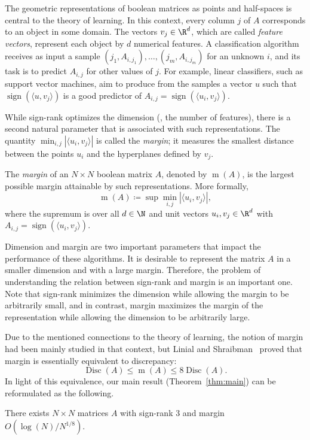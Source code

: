 \documentclass{toc}
\DeclareMathOperator{\Disc}{Disc}
\DeclareMathOperator{\sign}{sign}
\DeclareMathOperator{\margin}{m}
\newcommand{\defeq}{\coloneqq}
\begin{document}
The geometric representations of boolean matrices as points and half-spaces is central to the  theory of learning. In this context, every column $j$ of $A$ corresponds to an object in some domain. The vectors $v_j \in \R^d$, which are called \emph{feature vectors}, represent each object by  $d$ numerical features.  A classification algorithm receives as input a sample $(j_1,A_{i,j_1}),\ldots,(j_m,A_{i,j_m})$ for an unknown $i$, and its task is to predict $A_{i,j}$ for other values of $j$. For example, linear classifiers, such as support vector machines, aim to produce from the samples a vector $u$ such that $\sign(\langle u,v_j\rangle)$ is a good predictor of $A_{i,j}=\sign(\langle u_i,v_j\rangle)$. 


While sign-rank optimizes the dimension (\ie, the number of features), there is a second natural parameter that is associated with such representations. The quantity $\min_{i,j} |\langle u_i,v_j \rangle|$ is called the \emph{margin}; it measures the smallest distance between the points $u_i$ and the hyperplanes defined by $v_j$.   

The \emph{margin} of an $N \times N$ boolean matrix  $A$, denoted by $\margin(A)$, is the largest possible margin attainable by such representations. More formally,  
$$\margin(A) \defeq \sup \min_{i,j}\left|\langle u_i,v_j \rangle \right|,$$
where the supremum is over all $d \in \N$ and  unit vectors $u_i, v_j \in \R^d$ with $A_{i,j}=\sign(\langle u_i,v_j \rangle)$. 
 
Dimension and margin are two important parameters that impact   the performance of these algorithms. It is desirable to represent the matrix $A$ in a smaller dimension and with a large margin. Therefore, the problem of understanding the relation between sign-rank and margin is an important one. Note that sign-rank minimizes the dimension while allowing the margin to be arbitrarily small, and in contrast, margin maximizes the margin of the representation while allowing the dimension to be arbitrarily large.


Due to the mentioned connections to the theory of learning, the notion of margin had been mainly studied in that context, but Linial and Shraibman~\cite{MR2497381} proved that margin is essentially equivalent to discrepancy:
$$\Disc(A) \le \margin(A) \le 8 \Disc(A).$$
In light of this equivalence, our main result (Theorem~\ref{thm:main}) can be reformulated as the following. 

\begin{theorem}
\label{thm:signrankMargin}
There exists   $N \times N$ matrices $A$ with sign-rank $3$ and   margin $O(\log(N)/N^{1/8}).$
\end{theorem}
\end{document}
